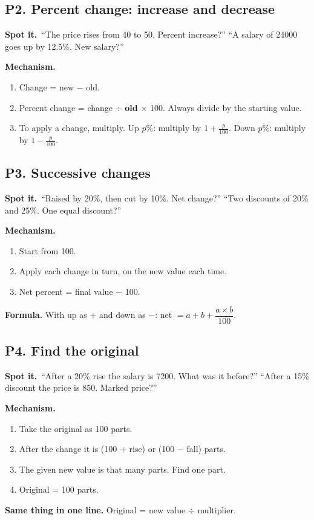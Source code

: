 \documentclass[11pt,a4paper]{article}
\let\oldsubsection\subsection
\renewcommand{\subsection}{\needspace{9\baselineskip}\oldsubsection}
\newcommand{\spot}{\textbf{\color{ember}Spot it.}\ }
\newcommand{\mech}{\textbf{\color{ember}Mechanism.}\ }
\begin{document}
\subsection{P2. Percent change: increase and decrease}
\spot ``The price rises from 40 to 50. Percent increase?'' ``A salary of 24000 goes up by 12.5\%. New salary?''

\mech
\begin{enumerate}
\item Change = new $-$ old.
\item Percent change = change $\div$ \textbf{old} $\times$ 100. Always divide by the starting value.
\item To apply a change, multiply. Up $p\%$: multiply by $1 + \tfrac{p}{100}$. Down $p\%$: multiply by $1 - \tfrac{p}{100}$.
\end{enumerate}

\subsection{P3. Successive changes}
\spot ``Raised by 20\%, then cut by 10\%. Net change?'' ``Two discounts of 20\% and 25\%. One equal discount?''

\mech
\begin{enumerate}
\item Start from 100.
\item Apply each change in turn, on the new value each time.
\item Net percent = final value $-$ 100.
\end{enumerate}
\textbf{Formula.} With up as $+$ and down as $-$: net $= a + b + \dfrac{a \times b}{100}$.

\subsection{P4. Find the original}
\spot ``After a 20\% rise the salary is 7200. What was it before?'' ``After a 15\% discount the price is 850. Marked price?''

\mech
\begin{enumerate}
\item Take the original as 100 parts.
\item After the change it is (100 + rise) or (100 $-$ fall) parts.
\item The given new value is that many parts. Find one part.
\item Original = 100 parts.
\end{enumerate}
\textbf{Same thing in one line.} Original = new value $\div$ multiplier.
\end{document}
